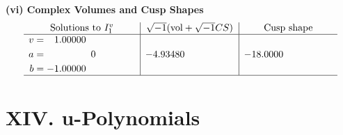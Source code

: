 \documentclass[1p]{elsarticle_modified}
\theoremstyle{definition}
\newcommand{\I}{\sqrt{-1}}
\begin{document}
\newpage\flushleft \textbf{(vi) Complex Volumes and Cusp Shapes}
$$\begin{array}{c|c|c}  
\text{Solutions to }I^v_{1}& \I (\text{vol} + \sqrt{-1}CS) & \text{Cusp shape}\\
 \hline 
\begin{aligned}
v &= \phantom{-}1.00000\phantom{ +0.000000I} \\
a &= \phantom{-0.000000 } 0 \\
b &= -1.00000\phantom{ +0.000000I}\end{aligned}
 & -4.93480\phantom{ +0.000000I} & -18.0000\phantom{ +0.000000I}\\
 \hline 
 \end{array}$$\newpage
\newpage\renewcommand{\arraystretch}{1}
\centering \section*{ XIV. u-Polynomials}
\end{document}

